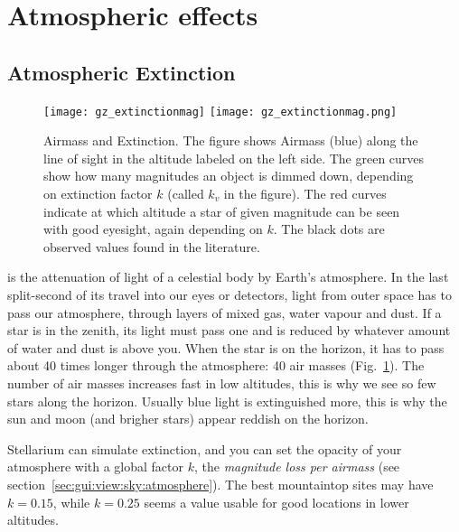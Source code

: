 \section{Atmospheric effects}
\label{sec:phenomena:Atmosphere}

\subsection{Atmospheric Extinction}
\label{sec:phenomena:Extinction}

\begin{figure}[tbp]
\centering
\ifpdf
\texttt{[image: gz\_extinctionmag]}
\else
\texttt{[image: gz\_extinctionmag.png]}
\fi
\caption{Airmass and Extinction.  The figure shows Airmass (blue)
  along the line of sight in the altitude labeled on the left side.
  The green curves show how many magnitudes an object is dimmed down,
  depending on extinction factor $k$ (called $k_v$ in the figure). The
  red curves indicate at which altitude a star of given magnitude can
  be seen with good eyesight, again depending on $k$. The black dots
  are observed values found in the literature.}
\label{fig:Extinction}
\end{figure}

 is the attenuation of light of a
celestial body by Earth's atmosphere. In the last split-second of its
travel into our eyes or detectors, light from outer space has to pass
our atmosphere, through layers of mixed gas, water vapour and dust. If
a star is in the zenith, its light must pass one 
and is reduced by whatever amount of water and dust is above you. When
the star is on the horizon, it has to pass about 40 times longer
through the atmosphere: 40 air masses (Fig.~\ref{fig:Extinction}). The
number of air masses increases fast in low altitudes, this is why we
see so few stars along the horizon. Usually blue light is extinguished
more, this is why the sun and moon (and brigher stars) appear reddish
on the horizon.

Stellarium can simulate extinction, and you can set the opacity of
your atmosphere with a global factor $k$, the \emph{magnitude loss per
  airmass} (see section~\ref{sec:gui:view:sky:atmosphere}). The best
mountaintop sites may have $k=0.15$, while $k=0.25$ seems a value
usable for good locations in lower altitudes.

